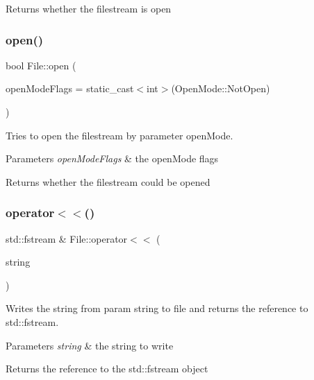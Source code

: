 \begin{DoxyReturn}{Returns}
whether the filestream is open 
\end{DoxyReturn}
\mbox{\label{class_file_a119cd771053819d0c82f7cccefb511ef}} 
\subsubsection{\texorpdfstring{open()}{open()}}
{\footnotesize\ttfamily bool File\+::open (\begin{DoxyParamCaption}\item[{int}]{open\+Mode\+Flags = {\ttfamily static\+\_\+cast$<$int$>$(OpenMode\+:\+:NotOpen)} }\end{DoxyParamCaption})}



Tries to open the filestream by parameter open\+Mode. 


\begin{DoxyParams}{Parameters}
{\em open\+Mode\+Flags} & the open\+Mode flags \\
\hline
\end{DoxyParams}
\begin{DoxyReturn}{Returns}
whether the filestream could be opened 
\end{DoxyReturn}
\mbox{\label{class_file_ac58f65f7af68645c95050e0faa296bcd}} 
\subsubsection{\texorpdfstring{operator$<$$<$()}{operator<<()}}
{\footnotesize\ttfamily std\+::fstream \& File\+::operator$<$$<$ (\begin{DoxyParamCaption}\item[{const \mbox{\hyperlink{class_a_string}{A\+String}} \&}]{string }\end{DoxyParamCaption})}



Writes the string from param string to file and returns the reference to std\+::fstream. 


\begin{DoxyParams}{Parameters}
{\em string} & the string to write \\
\hline
\end{DoxyParams}
\begin{DoxyReturn}{Returns}
the reference to the std\+::fstream object 
\end{DoxyReturn}
\mbox{\label{class_file_acc44c7f319708f0e378c08492d178fc0}} 
